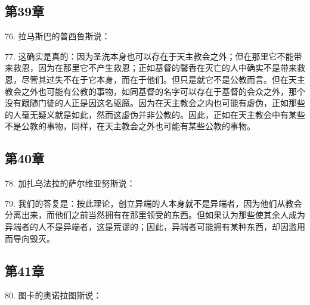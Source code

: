 
\subsection{第39章}

76. 拉马斯巴的普西鲁斯说：\par

77. 这确实是真的：因为圣洗本身也可以存在于天主教会之外；但在那里它不能带来救恩，因为在那里它不产生救恩；正如基督的馨香在灭亡的人中确实不是带来救恩，尽管其过失不在于它本身，而在于他们。但只是就它不是公教而言。但在天主教会之外也可能有公教的事物，如同基督的名字可以存在于基督的会众之外，那个没有跟随门徒的人正是因这名驱魔。因为在天主教会之内也可能有虚伪，正如那些的人毫无疑义就是如此，然而这虚伪并非公教的。因此，正如在天主教会中有某些不是公教的事物，同样，在天主教会之外也可能有某些公教的事物。\par


\subsection{第40章}

78. 加扎乌法拉的萨尔维亚努斯说：\par

79. 我们的答复是：按此理论，创立异端的人本身就不是异端者，因为他们从教会分离出来，而他们之前当然拥有在那里领受的东西。但如果认为那些使其余人成为异端者的人不是异端者，这是荒谬的；因此，异端者可能拥有某种东西，却因滥用而导向毁灭。\par


\subsection{第41章}

80. 图卡的奥诺拉图斯说：\par

